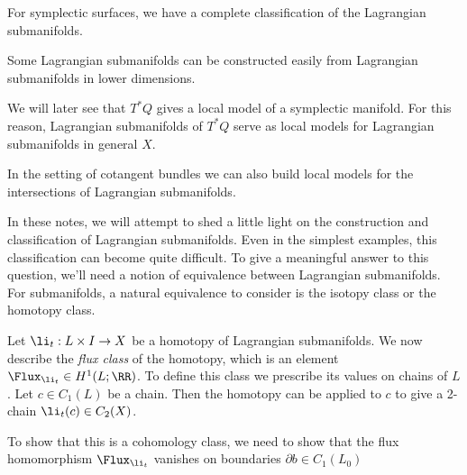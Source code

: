 
For symplectic surfaces, we have a complete classification of the Lagrangian submanifolds. 

Some Lagrangian submanifolds can be constructed easily from Lagrangian submanifolds in lower dimensions.

We will later see that  $T^*Q$ gives a local model of a symplectic manifold. For this reason, Lagrangian submanifolds of $T^*Q$  serve as local models for Lagrangian submanifolds in general $X$.


In the setting of cotangent bundles we can also build local models for the intersections of Lagrangian submanifolds.

In these notes, we will attempt to shed a little light on the construction and classification of Lagrangian submanifolds. 
Even in the simplest examples, this classification can become quite difficult. 
To give a meaningful answer to this question, we'll need a notion of equivalence between Lagrangian submanifolds. 
For submanifolds, a natural equivalence to consider is the isotopy class or the homotopy class.

Let $\li_t: L\times I\to X$ be a homotopy of Lagrangian submanifolds.
We now describe the \emph{flux class} of the homotopy, which is an element $\Flux_{\li_t}\in H^1(L;\RR)$.
To define this class we prescribe its values on chains of $L$. 
Let $c\in C_1(L)$ be a chain. 
Then the homotopy can be applied to $c$ to give a 2-chain $\li_t(c)\in C_2(X)$. 

To show that this is a cohomology class, we need to show that the flux homomorphism $\Flux_{\li_t}$ vanishes on boundaries $\partial b\in C_1(L_0)$ 

